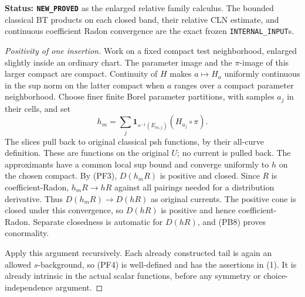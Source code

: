 \documentclass[11pt,a4paper]{article}
\numberwithin{equation}{section}
\theoremstyle{definition}
\theoremstyle{remark}
\begin{document}
\noindent\textbf{Status: \texttt{NEW\_PROVED}} as the enlarged
relative family calculus. The bounded classical BT products on each
closed band, their relative CLN estimate, and continuous coefficient
Radon convergence are the exact frozen \texttt{INTERNAL\_INPUT}s.

\begin{proof}[Positivity of one insertion]
Work on a fixed compact test neighborhood, enlarged slightly inside
an ordinary chart. The parameter image and the $\pi$-image of this
larger compact are compact. Continuity of $H$ makes
$a\mapsto H_a$ uniformly continuous in the sup norm on the latter
compact when $a$ ranges over a compact parameter neighborhood.
Choose finer finite Borel parameter partitions, with samples $a_j$
in their cells, and set
\[
                 h_m=\sum_j\mathbf1_{s^{-1}(E_{m,j})}
                                      (H_{a_j}\circ\pi).
 \tag{PF6}
\]
The slices pull back to original classical psh functions, by their
all-curve definition. These are functions on the original $U$;
no current is pulled back. The approximants have a common local
sup bound and converge uniformly to $h$ on the chosen compact.
By (PF3), $D(h_mR)$ is positive and closed. Since $R$ is
coefficient-Radon, $h_mR\to hR$ against all pairings needed for a
distribution derivative. Thus $D(h_mR)\to D(hR)$ as original
currents. The positive cone is closed under this convergence, so
$D(hR)$ is positive and hence coefficient-Radon. Separate closedness
is automatic for $D(hR)$, and (PB8) proves conormality.

Apply this argument recursively. Each already constructed tail is
again an allowed $s$-background, so (PF4) is well-defined and has
the assertions in (1). It is already intrinsic in the actual scalar
functions, before any symmetry or choice-independence argument.
\end{proof}
\end{document}
